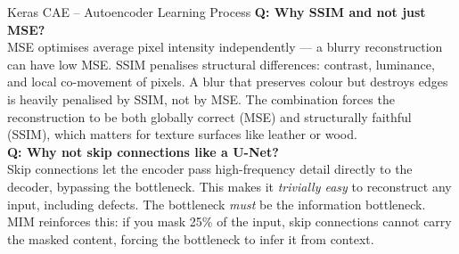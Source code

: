 \documentclass[aspectratio=169,10pt]{beamer}
\begin{document}
\begin{frame}{Keras CAE -- Autoencoder Learning Process}
{  \textbf{Q: Why SSIM and not just MSE?}\\[0.5pt]
  MSE optimises average pixel intensity independently — a blurry reconstruction can have
  low MSE. SSIM penalises structural differences: contrast, luminance, and local co-movement
  of pixels. A blur that preserves colour but destroys edges is heavily penalised by SSIM,
  not by MSE. The combination forces the reconstruction to be both globally correct (MSE)
  and structurally faithful (SSIM), which matters for texture surfaces like leather or wood.\\[1.5pt]

  \textbf{Q: Why not skip connections like a U-Net?}\\[0.5pt]
  Skip connections let the encoder pass high-frequency detail directly to the decoder,
  bypassing the bottleneck. This makes it \emph{trivially easy} to reconstruct any input,
  including defects. The bottleneck \emph{must} be the information bottleneck.
  MIM reinforces this: if you mask 25\% of the input, skip connections cannot carry
  the masked content, forcing the bottleneck to infer it from context.
}
\end{frame}
\end{document}
